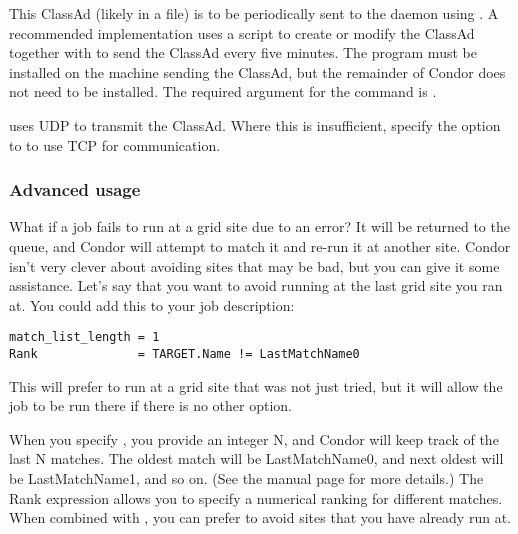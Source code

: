 
This ClassAd (likely in a file)
is to be periodically sent to the  daemon
using .
A recommended implementation uses a script to create or modify
the ClassAd together with
 to send the ClassAd every five minutes.
The  program must be installed on the 
machine sending the ClassAd, but the remainder of Condor
does not need to be installed.
The required argument for the  command
is .

 uses UDP to transmit the ClassAd.
Where this is insufficient,
specify the  option to 
to use TCP for communication. 

\subsubsection{Advanced usage}

What if a job fails to run at a grid site due to an error? It will be
returned to the queue, and Condor will attempt to match it and
re-run it at another site. Condor isn't very clever about avoiding
sites that may be bad, but you can give it some assistance. Let's say
that you want to avoid running at the last grid site you ran at. You
could add this to your job description:

\footnotesize
\begin{verbatim}
match_list_length = 1
Rank              = TARGET.Name != LastMatchName0
\end{verbatim}
\normalsize

This will prefer to run at a grid site that was not just tried, but it
will allow the job to be run there if there is no other option. 

When you specify , you provide an integer N, and
Condor will keep track of the last N matches. The oldest match will be
LastMatchName0, and next oldest will be LastMatchName1, and so on. (See
the  manual page for more details.) The Rank expression
allows you to specify a numerical ranking for different matches. When
combined with , you can prefer to avoid sites that
you have already run at. 

